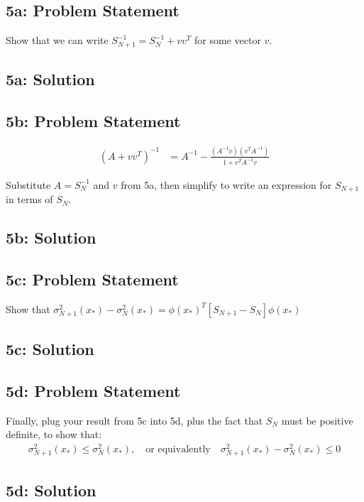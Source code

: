 \documentclass[12pt]{article}
\newcommand{\officialdirections}[1]{{\color{blue} #1}}
\begin{document}
\newpage
\officialdirections{
\subsection*{5a: Problem Statement}
Show that we can write $S_{N+1}^{-1} = S_N^{-1} + vv^T$ for some vector $v$.
}

\subsection{5a: Solution}




\newpage
\officialdirections{
\subsection*{5b: Problem Statement}
\begin{align}
(A + vv^T)^{-1} &= A^{-1} - \frac{ (A^{-1}v)(v^T A^{-1})}{ 1 + v^T A^{-1} v}
\end{align}

Substitute $A = S_N^{-1}$ and $v$ from 5a, then simplify to write an expression for $S_{N+1}$ in terms of $S_{N}$.
}

\subsection{5b: Solution}



\officialdirections{
\subsection*{5c: Problem Statement}
Show that $\sigma^2_{N+1}(x_*) - \sigma^2_{N}(x_*) = \phi(x_*)^T \left[ S_{N+1} - S_{N} \right] \phi(x_*)$ 

}

\subsection{5c: Solution}


\newpage
\officialdirections{
\subsection*{5d: Problem Statement}
Finally, plug your result from 5c into 5d, plus the fact that $S_N$ must be positive definite, to show that:
\begin{align}
\sigma_{N+1}^2(x_*) \leq \sigma_N^2(x_*), \quad \text{or equivalently} \quad \sigma_{N+1}^2(x_*) - \sigma_N^2(x_*) \leq 0
\end{align}
}

\subsection{5d: Solution}
\end{document}
